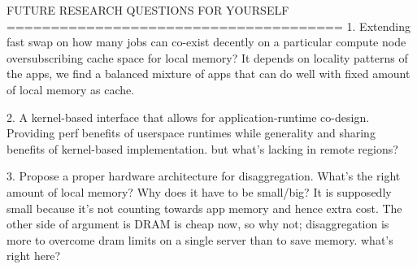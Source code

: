 FUTURE RESEARCH QUESTIONS FOR YOURSELF
======================================
1. Extending fast swap on how many jobs can 
co-exist decently on a particular compute node 
oversubscribing cache space for local memory?
It depends on locality patterns of the apps,
we find a balanced mixture of apps that can 
do well with fixed amount of local memory
as cache.

2. A kernel-based interface that allows for 
application-runtime co-design. Providing perf 
benefits of userspace runtimes while generality 
and sharing benefits of kernel-based 
implementation. but what's lacking in 
remote regions?

3. Propose a proper hardware architecture for
disaggregation. What's the right amount of 
local memory? Why does it have to be small/big?
It is supposedly small because it's not counting 
towards app memory and hence extra cost. 
The other side of argument is DRAM is cheap now,
so why not; disaggregation is more to overcome 
dram limits on a single server than to save 
memory. what's right here?  


